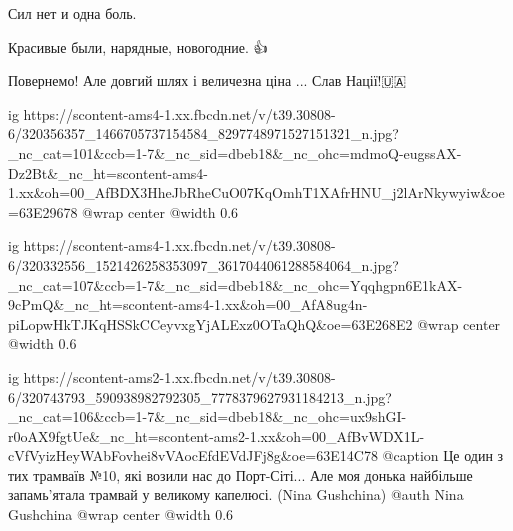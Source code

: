  
 
 
 
 

\qqSecCmt


Сил нет и одна боль.


Красивые были, нарядные, новогодние.
👍


Повернемо! Але довгий шлях і величезна ціна ... Слав Нації!🇺🇦


\ifcmt
  ig https://scontent-ams4-1.xx.fbcdn.net/v/t39.30808-6/320356357_1466705737154584_8297748971527151321_n.jpg?_nc_cat=101&ccb=1-7&_nc_sid=dbeb18&_nc_ohc=mdmoQ-eugssAX-Dz2Bt&_nc_ht=scontent-ams4-1.xx&oh=00_AfBDX3HheJbRheCuO07KqOmhT1XAfrHNU_j2lArNkywyiw&oe=63E29678
  @wrap center
  @width 0.6
\fi




\ifcmt
  ig https://scontent-ams4-1.xx.fbcdn.net/v/t39.30808-6/320332556_1521426258353097_3617044061288584064_n.jpg?_nc_cat=107&ccb=1-7&_nc_sid=dbeb18&_nc_ohc=Yqqhgpn6E1kAX-9cPmQ&_nc_ht=scontent-ams4-1.xx&oh=00_AfA8ug4n-piLopwHkTJKqHSSkCCeyvxgYjALExz0OTaQhQ&oe=63E268E2
  @wrap center
  @width 0.6
\fi



\ifcmt
  ig https://scontent-ams2-1.xx.fbcdn.net/v/t39.30808-6/320743793_590938982792305_7778379627931184213_n.jpg?_nc_cat=106&ccb=1-7&_nc_sid=dbeb18&_nc_ohc=ux9shGI-r0oAX9fgtUe&_nc_ht=scontent-ams2-1.xx&oh=00_AfBvWDX1L-cVfVyizHeyWAbFovhei8vVAocEfdEVdJFj8g&oe=63E14C78
  @caption Це один з тих трамваїв №10, які возили нас до Порт-Сіті... Але моя донька найбільше запамь'ятала трамвай у великому капелюсі. (Nina Gushchina)
  @auth Nina Gushchina
  @wrap center
  @width 0.6
\fi

